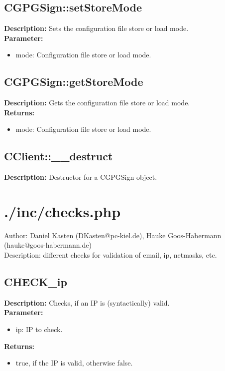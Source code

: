 \subsection{CGPGSign::setStoreMode}
\textbf{Description:} Sets the configuration file store or load mode.\\
\textbf{Parameter:}
\begin{itemize}
\item mode: Configuration file store or load mode.
\end{itemize}

\subsection{CGPGSign::getStoreMode}
\textbf{Description:} Gets the configuration file store or load mode.\\
\textbf{Returns:}
\begin{itemize}
\item mode: Configuration file store or load mode.
\end{itemize}

\subsection{CClient::\_\_destruct}
\textbf{Description:} Destructor for a CGPGSign object.\\

\newpage\section{./inc/checks.php}
 Author: Daniel Kasten (DKasten@pc-kiel.de), Hauke Goos-Habermann (hauke@goos-habermann.de)\\
 Description: different checks for validation of email, ip, netmasks, etc.\\

\subsection{CHECK\_ip}
\textbf{Description:} Checks, if an IP is (syntactically) valid.\\
\textbf{Parameter:}
\begin{itemize}
\item ip: IP to check.
\end{itemize}
\textbf{Returns:}
\begin{itemize}
\item true, if the IP is valid, otherwise false.
\end{itemize}

